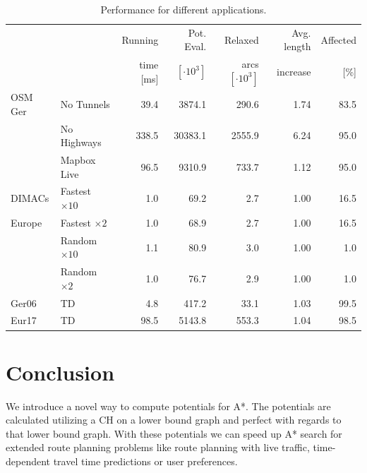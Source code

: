 \documentclass[a4paper,UKenglish,cleveref, autoref]{lipics-v2019}
\begin{document}
\begin{table}
\centering
\caption{Performance for different applications.}\label{tab:applications}
\begin{tabular}{llrrrrr}
\toprule
        &                     &   Running &     Pot. Eval. &             Relaxed & Avg. length & Affected \\
        &                     & time [ms] & $[\cdot 10^3]$ & arcs $[\cdot 10^3]$ &    increase &     [\%] \\
\midrule
OSM Ger & No Tunnels          &      39.4 &         3874.1 &               290.6 &        1.74 &     83.5 \\
        & No Highways         &     338.5 &        30383.1 &              2555.9 &        6.24 &     95.0 \\
        & Mapbox Live         &      96.5 &         9310.9 &               733.7 &        1.12 &     95.0 \\
\addlinespace
DIMACs  & Fastest $\times 10$ &       1.0 &           69.2 &                 2.7 &        1.00 &     16.5 \\
Europe  & Fastest $\times 2$  &       1.0 &           68.9 &                 2.7 &        1.00 &     16.5 \\
        & Random $\times 10$  &       1.1 &           80.9 &                 3.0 &        1.00 &      1.0 \\
        & Random $\times 2$   &       1.0 &           76.7 &                 2.9 &        1.00 &      1.0 \\
\addlinespace
Ger06   & TD                  &       4.8 &          417.2 &                33.1 &        1.03 &     99.5 \\
Eur17   & TD                  &      98.5 &         5143.8 &               553.3 &        1.04 &     98.5 \\
\bottomrule
\end{tabular}
\end{table}

\section{Conclusion}
\label{sec:conclusion}

We introduce a novel way to compute potentials for A*.
The potentials are calculated utilizing a CH on a lower bound graph and perfect with regards to that lower bound graph.
With these potentials we can speed up A* search for extended route planning problems like route planning with live traffic, time-dependent travel time predictions or user preferences.





\end{document}
